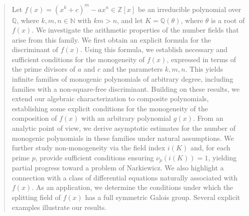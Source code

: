 \documentclass[table]{amsart}
\numberwithin{equation}{section}
\begin{document}
\begin{abstract}
Let $f(x)=(x^{k}+c)^{m}-ax^{n}\in\mathbb{Z}[x]$ be an irreducible polynomial over $\mathbb{Q}$, where $k,m,n\in\mathbb{N}$ with $km>n$, and let $K=\mathbb{Q}(\theta)$, where $\theta$ is a root of $f(x)$. We investigate the arithmetic properties of the number fields that arise from this family. We first obtain an explicit formula for the discriminant of $f(x)$. Using this formula, we establish necessary and sufficient conditions for the monogeneity of $f(x)$, expressed in terms of the prime divisors of $a$ and $c$ and the parameters $k,m,n$. This yields infinite families of monogenic polynomials of arbitrary degree, including families with a non-square-free discriminant. Building on these results, we extend our algebraic characterization to composite polynomials, establishing some explicit conditions for the monogeneity of the composition of $f(x)$ with an arbitrary polynomial $g(x)$.   From an analytic point of view, we derive asymptotic estimates for the number of monogenic polynomials in these families under natural assumptions. We further study non-monogeneity via the field index $i(K)$ and, for each prime $p$, provide sufficient conditions ensuring $\nu_p(i(K))=1$, yielding partial progress toward a problem of Narkiewicz. We also highlight a connection with a class of differential equations naturally associated with $f(x)$. As an application, we determine the conditions under which the splitting field of $f(x)$ has a full symmetric Galois group. Several explicit examples illustrate our results.
\end{abstract}
\end{document}

